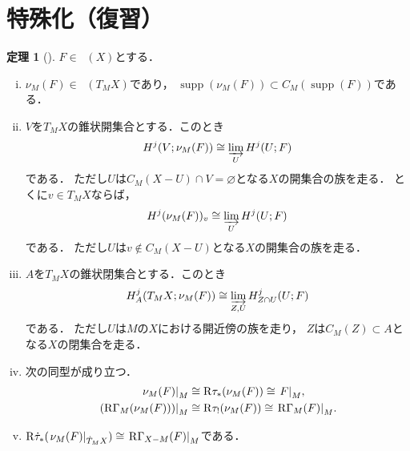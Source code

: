 \documentclass[uplatex,dvipdfmx,a4paper,10pt,draft]{jsarticle}
\theoremstyle{definition}
\newcommand{\rr}{\mathbf{R}}
\numberwithin{equation}{section}
\newcommand{\supp}{\mathop{\mathrm{supp}}\nolimits}
\newcommand{\Dompb}{\mathop{\mathsf{D}^\mathrm{b}}\nolimits}
\newcommand{\RG}{\mathop{\mathrm{R}\hspace{-0pt}\Gamma}\nolimits}
\newcommand{\Rder}{\mathrm{R}}
\newcommand{\indlim}[1][]{\mathop{\varinjlim}\limits_{#1}}
\newcommand{\mres}[2][]{{\left.{#1}\right\rvert}_{#2}}
\theoremstyle{mystyle}
\newtheorem{mythm}{定理}[section]
\newenvironment{thm}{\begin{thmbox}\begin{mythm}}{\end{mythm}\end{thmbox}}
\newcommand{\Dbcon}{\mathop{\mathsf{D}^{\mathrm{b}}_{\rr^+}}\nolimits}
\begin{document}
\section{特殊化（復習）{\cite[\S 4.2]{KS90}}}

\begin{thm}[{\cite[Thm 4.2.3]{KS90}}]
    \(F\in\Dompb(X)\)とする．
    \begin{enumerate}[(i)]
        \item \(\nu_{M}(F)\in\Dbcon(T_{M}X)\)であり，
        \(\supp(\nu_{M}(F))\subset C_{M}(\supp(F))\)である．
        \item \(V\)を\(T_{M}X\)の錐状開集合とする．このとき\[
            H^{j}(V;\nu_{M}(F))
            \cong
            \indlim[U]H^{j}(U;F)
        \]である．
        ただし\(U\)は\(
            C_{M}(X-U)\cap V=\varnothing
        \)となる\(X\)の開集合の族を走る．
        とくに\(v\in T_{M}X\)ならば，
        \[
            H^{j}(\nu_{M}(F))_{v}
            \cong
            \indlim[U]H^{j}(U;F)
        \]である．
        ただし\(U\)は\(
            v\notin C_{M}(X-U)
        \)となる\(X\)の開集合の族を走る．
        \item \(A\)を\(T_{M}X\)の錐状閉集合とする．このとき\[
            H^{j}_{A}(T_{M}X;\nu_{M}(F))
            \cong
            \indlim[Z,U]H^{j}_{Z\cap U}(U;F)
        \]である．
        ただし\(U\)は\(
            M
        \)の\(X\)における開近傍の族を走り，
        \(Z\)は\(C_{M}(Z)\subset A\)となる\(X\)の閉集合を走る．
        \item 次の同型が成り立つ．\begin{align*}
            \mres[\nu_{M}(F)]{M}&\cong \Rder{\tau}_{\ast}(\nu_{M}(F))\cong \mres[F]{M},\\
            \mres[(\RG_{M}(\nu_{M}(F)))]{M}&\cong \Rder{\tau}_{!}(\nu_{M}(F))\cong \mres[\RG_{M}(F)]{M}.
        \end{align*}
        \item \(\Rder{\dot{\tau}}_{\ast}(\mres[\nu_{M}(F)]{\dot{T}_{M}X})\cong\mres[\RG_{X-M}(F)]{M}\)である．
    \end{enumerate}
\end{thm}
\end{document}
